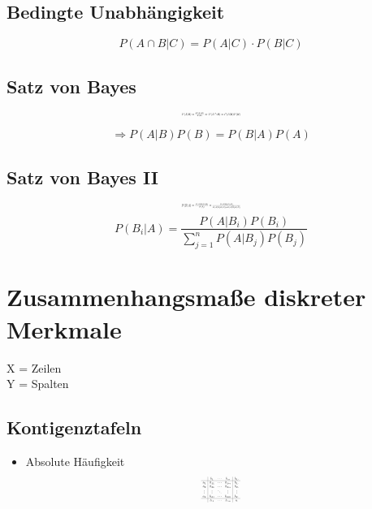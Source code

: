 \documentclass[10pt,a4paper,landscape]{article}
\begin{document}
\begin{multicols}{4}
\subsection{Bedingte Unabhängigkeit}
\[
P(A \cap B|C)=P(A|C)\cdot P(B|C)
\]

\subsection{Satz von Bayes}
\[ \resizebox{0.15\textwidth}{!}{$
P(A|B)=\frac{P(A\cap B)}{P(B)} \Rightarrow P(A\cap B)=P(A|B)P(B)
$}
\]

\[
\Rightarrow P(A|B)P(B)=P(B|A)P(A)
\]

\subsection{Satz von Bayes II}
\[ \resizebox{0.15\textwidth}{!}{$
P(B|A)=\frac{P(A|B)P(B)}{P(A)}=\frac{P(A|B)P(B)}{P(A|B)P(B)+P(A|\overline{B})P(\overline{B})}
$}
\]
\[ 
P(B_i|A)=\frac{P(A|B_i)P(B_i)}{\sum_{j=1}^n P(A|B_j)P(B_j)}
\]


\section{Zusammenhangsmaße diskreter Merkmale}
X = Zeilen \\
Y = Spalten
\subsection{Kontigenztafeln}
\begin{itemize}
\item Absolute Häufigkeit
\[ \resizebox{0.1\textwidth}{!}{$
\begin{array}{c|ccc|c}
  & b_1 & \cdots & b_m & h_{1\cdot} \\
\hline
a_1 & h_{11} & \cdots & h_{1m} & h_{1\cdot} \\
a_2 & h_{21} & \cdots & h_{2m} & h_{2\cdot} \\
\vdots & \vdots & \ddots & \vdots & \vdots \\
a_k & h_{k1} & \cdots & h_{km} & h_{k\cdot} \\
\hline
  & h_{\cdot 1} & \cdots & h_{\cdot m} & n
\end{array}
$}
\]


\end{itemize}
\end{multicols}
\end{document}
